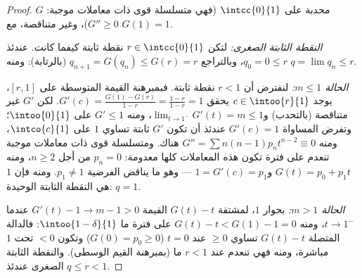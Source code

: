 \begin{proof}
$G$ محدبة على $\intcc{0}{1}$ (فهي متسلسلة قوى ذات معاملات موجبة: $G'' \geq 0$)،
وغير متناقصة، مع $G(1) = 1$.

\emph{النقطة الثابتة الصغرى:} لتكن $r \in \intcc{0}{1}$ نقطة ثابتة كيفما كانت.
عندئذ $q_0 = 0 \leq r$، وبالتراجع $q_{n+1} = G(q_n)
\leq G(r) = r$ (بالرتابة): ومنه $q = \lim q_n \leq r$.

\emph{الحالة $m \leq 1$:} لنفترض أن $r < 1$ نقطة ثابتة. فبمبرهنة القيمة
المتوسطة على $[r, 1]$، يوجد $c \in \intoo{r}{1}$ يحقق $G'(c) = \frac{G(1) - G(r)}{1 - r} = \frac{1 - r}{1 - r} = 1$. لكن $G'$ غير
متناقصة (بالتحدب) و$\lim_{t\to1^-}G'(t) = m
\leq 1$، ومنه $G' \leq 1$ على $\intoo{0}{1}$؛ وتفرض المساواة
$G'(c) =
1$ عندئذ أن تكون $G'$ ثابتة تساوي $1$ على $\intco{c}{1}$، ومنه
$G'' = \sum n(n-1)p_nt^{n-2} \equiv 0$ هناك. ومتسلسلة قوى ذات معاملات موجبة تنعدم على فترة تكون هذه
المعاملات كلها معدومة: $p_n = 0$ من أجل $n \geq 2$، ومنه $G(t) = p_0
+ p_1t$ و$1 = G'(c) = p_1$
--- وهو ما يناقض الفرضية $p_1 \neq 1$. ومنه فإن $1$ هي النقطة الثابتة
الوحيدة: $q = 1$.

\emph{الحالة $m > 1$:} بجوار $1$، لمشتقة $G(t) - t$ القيمة $G'(t) -
1 \to m - 1 > 0$
عندما $t \to 1^-$، ومنه $G(t) - t < G(1) - 1 = 0$ على فترة ما $\intoo{1 - \delta}{1}$: فالدالة المتصلة
$G(t) - t$ تساوي $\geq 0$ عند $t = 0$ ($G(0) = p_0 \geq 0$) وتكون $< 0$ تحت $1$
مباشرة، ومنه فهي تنعدم عند $r < 1$ ما (بمبرهنة القيم الوسطى).
والنقطة الثابتة الصغرى عندئذ $q \leq r < 1$.
\end{proof}

